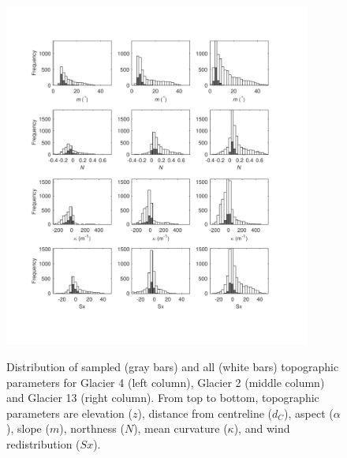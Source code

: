 \documentclass[onecolumn, letterpaper]{igs}
\renewcommand{\thefigure}{S\arabic{figure}}
\begin{document}
\renewcommand{\thefigure}{S\arabic{figure} (Cont.)}
\addtocounter{figure}{-1}

\begin{figure}[]
\centering
	\includegraphics[width =0.9\textwidth]{TopoParamsSampled2.pdf}\\
	\caption{Distribution of sampled (gray bars) and all (white bars) topographic parameters for  Glacier 4 (left column), Glacier 2 (middle column) and Glacier 13 (right column). From top to bottom, topographic parameters are elevation ($z$), distance from centreline ($d_C$), aspect ($\alpha$), slope ($m$), northness ($N$), mean curvature ($\kappa$), and wind redistribution ($Sx$).}
	\label{fig:TopoParamsSampled2}
\end{figure}
\end{document}
